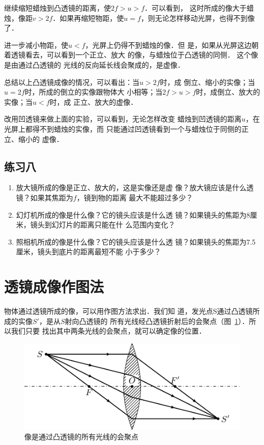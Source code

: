 继续缩短蜡烛到凸透镜的距离，使$2f>u>f$．可以看到，
这时所成的像大于蜡烛，像距$v>2f$．如果再缩短物距，使$u=
f$，则无论怎样移动光屏，也得不到像了．

进一步减小物距，使$u<f$，光屏上仍得不到蜡烛的像．但
是，如果从光屏这边朝着透镜看去，可以看到一个正立、放大
的像，与蜡烛位于凸透镜的同侧．
这个像是由通过凸透镜的
光线的反向延长线会聚成的，是虚像．

总结以上凸透镜成像的情况，可以看出：当$u>2f$时，成
倒立、缩小的实像；当$u=2f$时，所成的倒立的实像跟物体大
小相等；当$2f>u>f$时，成倒立、放大的实像；当$u<f$时，成
正立、放大的虚像．

改用凹透镜来做上面的实验，可以看到，无论怎样改变
蜡烛到凹透镜的距离$u$，在光屏上都得不到蜡烛的实像，而
只能通过凹透镜看到一个与蜡烛位于同侧的正立、缩小的
虚像．

\subsection*{练习八}
\begin{enumerate}
    \item 放大镜所成的像是正立、放大的，这是实像还是虚
像？放大镜应该是什么透镜？如果其焦距为$f$，镜到物的距离
最大不能超过多少？
\item 幻灯机所成的像是什么像？它的镜头应该是什么透
镜？如果镜头的焦距为8厘米，镜头到幻灯片的距离只能在什
么范围内变化？
\item 照相机所成的像是什么像？它的镜头应该是什么透
镜？如果镜头的焦距为7.5厘米，镜头到底片的距离最短不能
小于多少？
\end{enumerate}

\section{透镜成像作图法}
物体通过透镜所成的像，可以用作图方法求出．我们知
道，发光点S通过凸透镜所成的实像$S'$，是从$S$射向凸透镜的
所有光线经凸透镜折射后的会聚点（图~\ref{fig_C_5-39}）．所以我们只要
找出其中两条光线的会聚点，就可以确定像的位置．
\begin{figure}[htbp]
    \centering
    \includegraphics{fig/C/5-39.pdf}
    \caption{像是通过凸透镜的所有光线的会聚点}\label{fig_C_5-39}
\end{figure}


